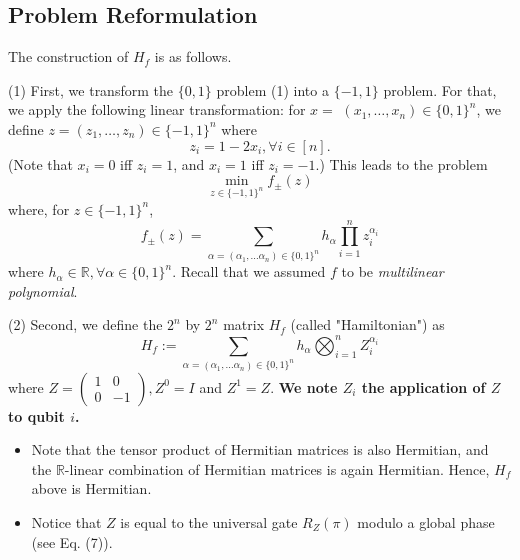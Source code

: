 \subsection{Problem Reformulation}

The construction of $H_{f}$ is as follows. 

(1) First, we transform the $\{0,1\}$ problem (1) into a $\{-1,1\}$ problem. For that, we apply the following linear transformation: for $x=$ $\left(x_{1}, \ldots, x_{n}\right) \in\{0,1\}^{n}$, we define $z=\left(z_{1}, \ldots, z_{n}\right) \in\{-1,1\}^{n}$ where
\begin{equation}
    z_{i}=1-2 x_{i}, \forall i \in[n]. \tag{20}
\end{equation}
(Note that $x_{i}=0$ iff $z_i=1$, and $x_{i}=1$ iff $z_i=-1.$) This leads to the problem
\begin{equation}
    \min _{z \in\{-1,1\}^{n}} f_{ \pm}(z)
\end{equation}
where, for $z \in\{-1,1\}^{n}$,
\begin{equation}
    f_{ \pm}(z)=\sum_{\alpha=\left(\alpha_{1}, \ldots \alpha_{n}\right) \in\{0,1\}^{n}} h_{\alpha} \prod_{i=1}^{n} z_{i}^{\alpha_{i}}
\end{equation}
where $h_{\alpha} \in \mathbb{R}, \forall \alpha \in\{0,1\}^{n}$. Recall that we assumed $f$ to be \textit{multilinear polynomial}. %

(2) Second, we define the $2^n$ by $2^n$ matrix $H_{f}$ (called "Hamiltonian") as
\begin{equation}
    H_{f}:=\sum_{\alpha=\left(\alpha_{1}, \ldots \alpha_{n}\right) \in\{0,1\}^{n}} h_{\alpha} \bigotimes_{i=1}^{n} Z_{i}^{\alpha_{i}}
\end{equation}
where $Z=\left(\begin{array}{cc}1 & 0 \\ 0 & -1\end{array}\right), Z^{0}=I$ and $Z^{1}=Z$. \textbf{We note $Z_{i}$ the application of $Z$ to qubit $i$. } %

\begin{itemize}
    \item Note that the tensor product of Hermitian matrices is also Hermitian, and the $\mathbb{R}$-linear combination of Hermitian matrices is again Hermitian. Hence, $H_{f}$ above is Hermitian.
    \item Notice that $Z$ is equal to the universal gate $R_{Z}(\pi)$ modulo a global phase (see Eq. (7)).
\end{itemize}


